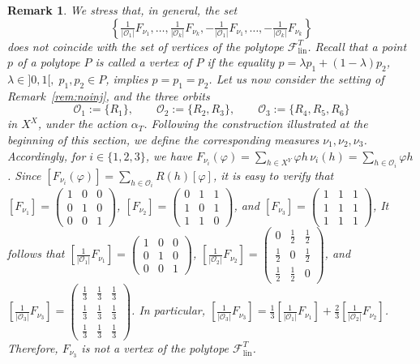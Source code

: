 \documentclass[11pt]{article}
\newtheorem{rem}[theorem]{Remark}
\begin{document}
{\begin{rem}
    We stress that, in general, the set
\[
\left\{ \tfrac{1}{|\mathcal{O}_1|}F_{\nu_1}, \dots, \tfrac{1}{|\mathcal{O}_k|}F_{\nu_k},
-\tfrac{1}{|\mathcal{O}_1|}F_{\nu_1}, \dots, -\tfrac{1}{|\mathcal{O}_k|}F_{\nu_k} \right\}
\]
does not coincide with the set of vertices of the polytope $\mathcal{F}^T_{\mathrm{lin}}$.
Recall that a point $p$ of a polytope $P$ is called a vertex of $P$ if the equality
$p = \lambda p_1 + (1-\lambda)p_2$,
$\lambda \in ]0,1[,\; p_1,p_2 \in P$,
implies $p = p_1 = p_2$.
Let us now consider the setting of Remark~\ref{rem:noinj}, and the three orbits
\[
\mathcal{O}_1 := \{R_1\}, \qquad
\mathcal{O}_2 := \{R_2, R_3\}, \qquad
\mathcal{O}_3 := \{R_4, R_5, R_6\}
\]
in $X^X$, under the action $\alpha_T$.
Following the construction illustrated at the beginning of this section, we
define the corresponding measures $\nu_1, \nu_2, \nu_3$.
Accordingly, for $i \in \{1,2,3\}$, we have
$F_{\nu_i}(\varphi)
= \sum_{h \in X^Y} \varphi h\, \nu_i(h)
= \sum_{h \in \mathcal{O}_i} \varphi h$.
Since $[F_{\nu_i}(\varphi)]
= \sum_{h \in \mathcal{O}_i} R(h)[\varphi]$,
it is easy to verify that
$[F_{\nu_1}] =
\begin{pmatrix}
1 & 0 & 0 \\
0 & 1 & 0 \\
0 & 0 & 1
\end{pmatrix}$, 
$[F_{\nu_2}] =
\begin{pmatrix}
0 & 1 & 1 \\
1 & 0 & 1 \\
1 & 1 & 0
\end{pmatrix}$, 
and
$[F_{\nu_3}] =
\begin{pmatrix}
1 & 1 & 1 \\
1 & 1 & 1 \\
1 & 1 & 1
\end{pmatrix}$, 
It follows that
$\left[\frac{1}{|\mathcal{O}_1|}F_{\nu_1}\right] =
\begin{pmatrix}
1 & 0 & 0 \\
0 & 1 & 0 \\
0 & 0 & 1
\end{pmatrix}$, 
$\left[\frac{1}{|\mathcal{O}_2|}F_{\nu_2}\right] =
\begin{pmatrix}
0 & \tfrac{1}{2} & \tfrac{1}{2} \\
\tfrac{1}{2} & 0 & \tfrac{1}{2} \\
\tfrac{1}{2} & \tfrac{1}{2} & 0
\end{pmatrix}$, 
and
$\left[\frac{1}{|\mathcal{O}_3|}F_{\nu_3}\right] =
\begin{pmatrix}
\tfrac{1}{3} & \tfrac{1}{3} & \tfrac{1}{3} \\
\tfrac{1}{3} & \tfrac{1}{3} & \tfrac{1}{3} \\
\tfrac{1}{3} & \tfrac{1}{3} & \tfrac{1}{3}
\end{pmatrix}$.
In particular,
$\left[\frac{1}{|\mathcal{O}_3|}F_{\nu_3}\right] = \frac{1}{3}\left[\frac{1}{|\mathcal{O}_1|}F_{\nu_1}\right] + \frac{2}{3}\left[\frac{1}{|\mathcal{O}_2|}F_{\nu_2}\right]$.
Therefore, $F_{\nu_3}$ is not a vertex of the polytope $\mathcal{F}^T_{\mathrm{lin}}$.
\end{rem}
}
\end{document}
